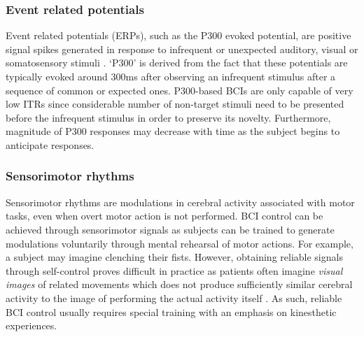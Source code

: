 \subsubsection{Event related potentials}
Event related potentials (ERPs), such as the P300 evoked potential, are positive signal spikes generated in response to infrequent or unexpected auditory, visual or somatosensory stimuli \cite{bci-survey-nicolas-alonso}. `P300' is derived from the fact that these potentials are typically evoked around 300ms after observing an infrequent stimulus after a sequence of common or expected ones. P300-based BCIs are only capable of very low ITRs since considerable number of non-target stimuli need to be presented before the infrequent stimulus in order to preserve its novelty. Furthermore, magnitude of P300 responses may decrease with time as the subject begins to anticipate responses. 

\subsubsection{Sensorimotor rhythms}
Sensorimotor rhythms are modulations in cerebral activity associated with motor tasks, even when overt motor action is not performed. BCI control can be achieved through sensorimotor signals as subjects can be trained to generate modulations voluntarily through mental rehearsal of motor actions. For example, a subject may imagine clenching their fists. However, obtaining reliable signals through self-control proves difficult in practice as patients often imagine \textit{visual images } of related movements which does not produce sufficiently similar cerebral activity to the image of performing the actual activity itself \cite{bci-survey-nicolas-alonso}. As such, reliable BCI control usually requires special training with an emphasis on kinesthetic experiences.

